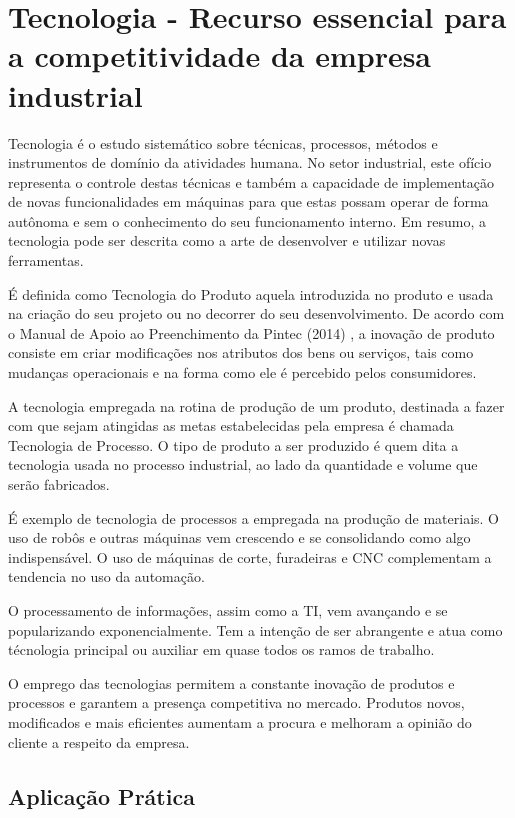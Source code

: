 \chapter{Tecnologia - Recurso essencial para a competitividade da empresa industrial}
\label{chap:tecnologia_recurso}

Tecnologia é o estudo sistemático sobre técnicas, processos, métodos e instrumentos de domínio da atividades humana. No setor industrial, este ofício representa o controle destas técnicas e também a capacidade de implementação de novas funcionalidades em máquinas para que estas possam operar de forma autônoma e sem o conhecimento do seu funcionamento interno. Em resumo, a tecnologia pode ser descrita como a arte de desenvolver e utilizar novas ferramentas.

É definida como Tecnologia do Produto aquela introduzida no produto e usada na criação do seu projeto ou no decorrer do seu desenvolvimento. De acordo com o Manual de Apoio ao Preenchimento da Pintec (2014) %
, a inovação de produto consiste em criar modificações nos atributos dos bens ou serviços, tais como mudanças operacionais e na forma como ele é percebido pelos consumidores.

A tecnologia empregada na rotina de produção de um produto, destinada a fazer com que sejam atingidas as metas estabelecidas pela empresa é chamada Tecnologia de Processo. O tipo de produto a ser produzido é quem dita a tecnologia usada no processo industrial, ao lado da quantidade e volume que serão fabricados.

É exemplo de tecnologia de processos a empregada na produção de materiais. O uso de robôs e outras máquinas vem crescendo e se consolidando como algo indispensável. O uso de máquinas de corte, furadeiras e \ac{CNC} complementam a tendencia no uso da automação.

O processamento de informações, assim como a \ac{TI}, vem avançando e se popularizando exponencialmente. Tem a intenção de ser abrangente e atua como técnologia principal ou auxiliar em quase todos os ramos de trabalho.

O emprego das tecnologias permitem a constante inovação de produtos e processos e garantem a presença competitiva no mercado. Produtos novos, modificados e mais eficientes aumentam a procura e melhoram a opinião do cliente a respeito da empresa.


\section{Aplicação Prática}
\label{sec:tecnologia_recurso_aplicacao}


